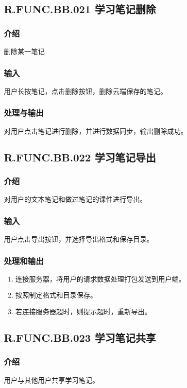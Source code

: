  \subsection{R.FUNC.BB.021 学习笔记删除}
    \subsubsection{介绍}
	   删除某一笔记
    \subsubsection{输入}
	   用户长按笔记，点击删除按钮，删除云端保存的笔记。
    \subsubsection{处理与输出}
	   对用户点击笔记进行删除，并进行数据同步，输出删除成功。

 \subsection{R.FUNC.BB.022 学习笔记导出}
    \subsubsection{介绍}
	   对用户的文本笔记和做过笔记的课件进行导出。
    \subsubsection{输入}
	   用户点击导出按钮，并选择导出格式和保存目录。
    \subsubsection{处理和输出}
    \begin{enumerate}
      \item 连接服务器，将用户的请求数据处理打包发送到用户端。
      \item 按照制定格式和目录保存。
      \item 若连接服务器超时，则提示超时，重新导出。
    \end{enumerate}

 \subsection{R.FUNC.BB.023 学习笔记共享}
    \subsubsection{介绍}
	   用户与其他用户共享学习笔记。
